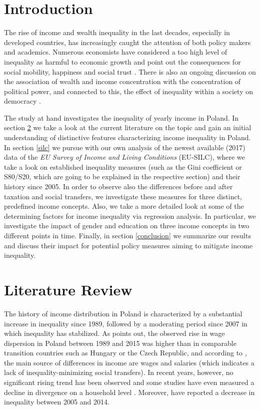 \documentclass[a4paper]{article}\usepackage[]{graphicx}\usepackage[]{color}
\begin{document}
\section{Introduction}
The rise of income and wealth inequality in the last decades, especially in developed countries, has increasingly caught the attention of both policy makers and academics. Numerous economists have considered a too high level of inequality as harmful to economic growth and point out the consequences for social mobility, happiness and social trust \parencite{brzezinski2017, Muszynska2018}. There is also an ongoing discussion on the association of wealth and income concentration with the concentration of political power, and connected to this, the effect of inequality within a society on democracy \parencite{houle2009}. 

The study at hand investigates the inequality of yearly income in Poland. In section \ref{literature} we take a look at the current literature on the topic and gain an initial understanding of distinctive features characterizing income inequality in Poland. In section \ref{silc} we pursue with our own analysis of the newest available (2017) data of the \textit{EU Survey of Income and Living Conditions} (EU-SILC), where we take a look on established inequality measures (such as the Gini coefficient or S80/S20, which are going to be explained in the respective section) and their history since 2005. In order to observe also the differences before and after taxation and social transfers, we investigate these measures for three distinct, predefined income concepts. Also, we take a more detailed look at some of the determining factors for income inequality via regression analysis. In particular, we investigate the impact of gender and education on three income concepts in two different points in time. Finally, in section \ref{conclusion} we summarize our results and discuss their impact for potential policy measures aiming to mitigate income inequality. 


\section{Literature Review} 
\label{literature}
The history of income distribution in Poland is characterized by a substantial increase in inequality since 1989, followed by a moderating period since 2007 in which inequality has stabilized. As \cite{brzezinski2017} points out, the observed rise in wage dispersion in Poland between 1989 and 2015 was higher than in comparable transition countries such as Hungary or the Czech Republic, and according to \cite{jedrzejczak2008}, the main source of differences in income are wages and salaries (which indicates a lack of inequality-minimizing social transfers). In recent years, however, no significant rising trend has been observed \parencite{brzezinski2017} and some studies have even measured a decline in divergence on a household level \parencite{Gestwicki2016}. Moreover, \cite{Muszynska2018} have reported a decrease in inequality between 2005 and 2014. 
\end{document}

